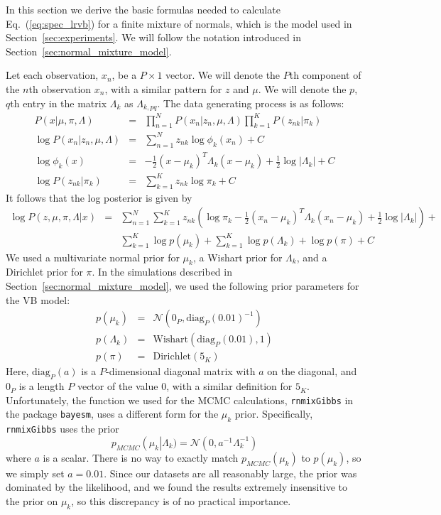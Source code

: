 \documentclass{article}\usepackage[]{graphicx}\usepackage[]{color}
\newcommand{\mysec}[1]{Section~\ref{sec:#1}}
\newcommand{\eq}[1]{Eq.~(\ref{eq:#1})}
\newcommand{\constant}{C} %
\theoremstyle{plain}
\begin{document}
In this section we derive the basic formulas needed to calculate \eq{spec_lrvb}
for a finite mixture of normals, which
is the model used in \mysec{experiments}.  We will
follow the notation introduced in \mysec{normal_mixture_model}.

Let each observation, $x_{n}$, be a $P\times1$ vector. We will denote
the $P$th component of the $n$th observation $x_{n}$, with a
similar pattern for $z$ and $\mu$. We will denote the $p$, $q$th
entry in the matrix $\Lambda_{k}$ as $\Lambda_{k,pq}$. The data
generating process is as follows:
%
\begin{eqnarray*}
P\left(x | \mu, \pi, \Lambda \right) &=&
  \prod_{n=1}^N P\left(x_{n}|z_{n},\mu,\Lambda \right)
  \prod_{k=1}^{K} P\left(z_{nk}|\pi_{k} \right)\\
\log P\left(x_{n}|z_{n},\mu,\Lambda\right) & = &
    \sum_{n=1}^{N}z_{nk}\log\phi_{k}(x_{n}) + \constant\\
\log\phi_{k}(x) & = & -\frac{1}{2}\left(x - \mu_{k}\right)^{T} \Lambda_{k}\left(x-\mu_{k}\right) +
    \frac{1}{2}\log\left|\Lambda_{k}\right|+ \constant\\
\log P(z_{nk}|\pi_{k}) & = & \sum_{k=1}^{K}z_{nk}\log\pi_{k} + \constant
\end{eqnarray*}
%
It follows that the log posterior is given by
%
\begin{eqnarray*}
\log P(z,\mu,\pi,\Lambda | x) & = & \sum_{n=1}^{N}\sum_{k=1}^{K}z_{nk}\left(\log\pi_{k}-\frac{1}{2}\left(x_{n}-\mu_{k}\right)^{T}\Lambda_{k}\left(x_{n}-\mu_{k}\right)+\frac{1}{2}\log\left|\Lambda_{k}\right|\right) + \\
  &  & \sum_{k=1}^{K} \log p(\mu_{k}) + \sum_{k=1}^{K} \log p(\Lambda_{k}) +
        \log p(\pi) + \constant
\end{eqnarray*}
%
We used a multivariate normal prior for $\mu_{k}$, a Wishart prior for
$\Lambda_{k}$, and a Dirichlet prior for $\pi$.  In the simulations described
in \mysec{normal_mixture_model}, we used the following prior parameters
for the VB model:
%
\begin{eqnarray*}
  p(\mu_{k}) &=& \mathcal{N}\left(0_P, \textrm{diag}_P(0.01)^{-1}\right) \\
  p(\Lambda_{k}) &=& \textrm{Wishart}(\textrm{diag}_P(0.01), 1)\\
  p(\pi) &=& \textrm{Dirichlet}(5_K)
\end{eqnarray*}
%
Here, $\textrm{diag}_P(a)$ is a $P$-dimensional diagonal matrix with $a$ on the
diagonal, and $0_P$ is a length $P$ vector of the value $0$, with a similar
definition for $5_K$. Unfortunately, the function we used for the MCMC
calculations, \texttt{rnmixGibbs} in the package \texttt{bayesm}, uses a
different form for the $\mu_{k}$ prior. Specifically, \texttt{rnmixGibbs} uses
the prior
%
$$
  p_{MCMC}\left(\mu_{k} \right \vert \Lambda_{k}) =
    \mathcal{N}(0, a^{-1} \Lambda_{k}^{-1})
$$
%
where $a$ is a scalar.  There is no way to exactly match
$p_{MCMC}(\mu_k)$ to $p(\mu_k)$, so we simply set $a=0.01$.
Since our datasets are all reasonably large, the prior was dominated by the
likelihood, and we found the results extremely insensitive to the prior
on $\mu_{k}$, so this discrepancy is of no practical importance.
\end{document}
